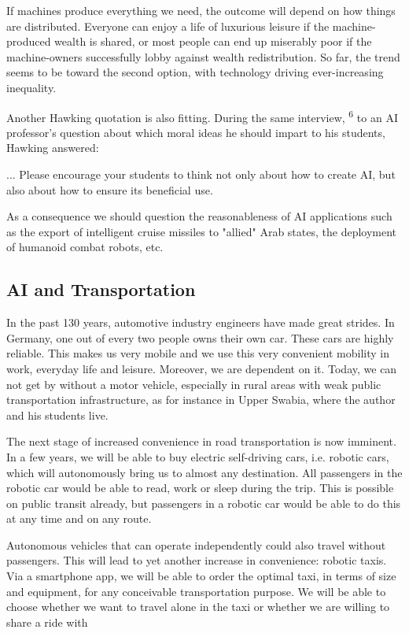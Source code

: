 \documentclass[10pt]{book}
\begin{document}
\begin{displayquote}
If machines produce everything we need, the outcome will depend on how things are distributed. Everyone can enjoy a life of luxurious leisure if the machine-produced wealth is shared, or most people can end up miserably poor if the machine-owners successfully lobby against wealth redistribution. So far, the trend seems to be toward the second option, with technology driving ever-increasing inequality.
\end{displayquote}

Another Hawking quotation is also fitting. During the same interview, \textsuperscript{6} to an AI professor's question about which moral ideas he should impart to his students, Hawking answered:

\begin{displayquote}
... Please encourage your students to think not only about how to create AI, but also about how to ensure its beneficial use.
\end{displayquote}

As a consequence we should question the reasonableness of AI applications such as the export of intelligent cruise missiles to "allied" Arab states, the deployment of humanoid combat robots, etc.

\subsection{AI and Transportation}
In the past 130 years, automotive industry engineers have made great strides. In Germany, one out of every two people owns their own car. These cars are highly reliable. This makes us very mobile and we use this very convenient mobility in work, everyday life and leisure. Moreover, we are dependent on it. Today, we can not get by without a motor vehicle, especially in rural areas with weak public transportation infrastructure, as for instance in Upper Swabia, where the author and his students live.

The next stage of increased convenience in road transportation is now imminent. In a few years, we will be able to buy electric self-driving cars, i.e. robotic cars, which will autonomously bring us to almost any destination. All passengers in the robotic car would be able to read, work or sleep during the trip. This is possible on public transit already, but passengers in a robotic car would be able to do this at any time and on any route.

Autonomous vehicles that can operate independently could also travel without passengers. This will lead to yet another increase in convenience: robotic taxis. Via a smartphone app, we will be able to order the optimal taxi, in terms of size and equipment, for any conceivable transportation purpose. We will be able to choose whether we want to travel alone in the taxi or whether we are willing to share a ride with
\end{document}

